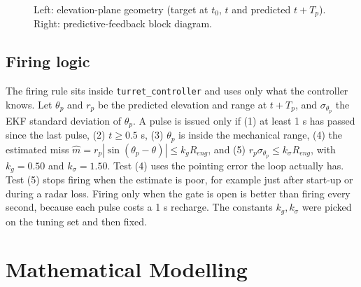 \documentclass[conference]{IEEEtran}
\begin{document}
\begin{figure}[t]
\caption{Left: elevation-plane geometry (target at $t_0$, $t$ and predicted $t{+}T_p$). Right: predictive-feedback block diagram.}
\label{fig:arch}
\end{figure}

\subsection{Firing logic}
The firing rule sits inside \texttt{turret\_controller} and uses only what the controller knows. Let $\theta_p$ and $r_p$ be the predicted elevation and range at $t+T_p$, and $\sigma_{\theta_p}$ the EKF standard deviation of $\theta_p$. A pulse is issued only if (1) at least 1 s has passed since the last pulse, (2) $t\ge0.5$ s, (3) $\theta_p$ is inside the mechanical range, (4) the estimated miss $\hat m=r_p|\sin(\theta_p-\theta)|\le k_gR_{eng}$, and (5) $r_p\sigma_{\theta_p}\le k_\sigma R_{eng}$, with $k_g=0.50$ and $k_\sigma=1.50$. Test (4) uses the pointing error the loop actually has. Test (5) stops firing when the estimate is poor, for example just after start-up or during a radar loss. Firing only when the gate is open is better than firing every second, because each pulse costs a 1 s recharge. The constants $k_g,k_\sigma$ were picked on the tuning set and then fixed.

\section{Mathematical Modelling}
\end{document}
